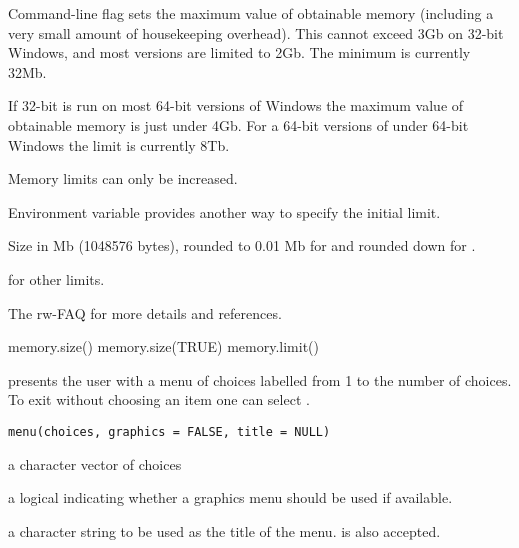 %
\begin{Details}\relax
Command-line flag  sets the maximum value of
obtainable memory (including a very small amount of housekeeping
overhead).  This cannot exceed 3Gb on 32-bit Windows, and most
versions are limited to 2Gb.  The minimum is currently 32Mb.

If 32-bit \R{} is run on most 64-bit versions of Windows the maximum
value of obtainable memory is just under 4Gb.  For a 64-bit versions
of \R{} under 64-bit Windows the limit is currently 8Tb.

Memory limits can only be increased.

Environment variable  provides another way to
specify the initial limit.
\end{Details}
%
\begin{Value}
Size in Mb (1048576 bytes), rounded to 0.01 Mb for 
and rounded down for .
\end{Value}
%
\begin{SeeAlso}\relax
{} for other limits.

The rw-FAQ for more details and references.
\end{SeeAlso}
%
\begin{Examples}
\begin{ExampleCode}
memory.size()
memory.size(TRUE)
memory.limit()
\end{ExampleCode}
\end{Examples}
%
\begin{Description}\relax
{} presents the user with a menu of choices labelled from 1
to the number of choices.  To exit without choosing an item one can
select .
\end{Description}
%
\begin{Usage}
\begin{verbatim}
menu(choices, graphics = FALSE, title = NULL)
\end{verbatim}
\end{Usage}
%
\begin{Arguments}
\begin{ldescription}
\item[\code{choices}] a character vector of choices
\item[\code{graphics}] a logical indicating whether a graphics menu should be
used if available.
\item[\code{title}] a character string to be used as the title of the menu.
 is also accepted.
\end{ldescription}
\end{Arguments}
